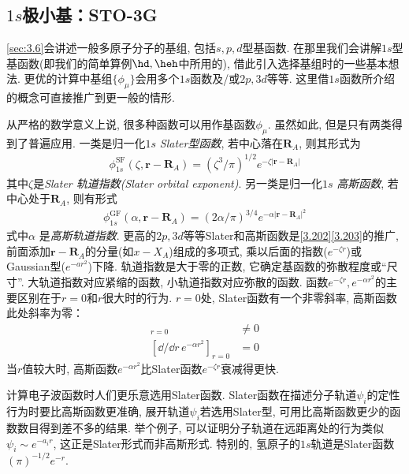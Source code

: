 \subsection{$1s$极小基：STO-3G}
\label{sec3.5.1}
\autoref{sec:3.6}会讲述一般多原子分子的基组, 包括$s,p,d$型基函数. 
在那里我们会讲解$1s$型基函数(即我们的简单算例$\hd,\heh$中所用的), 借此引入选择基组时的一些基本想法. 
更优的计算中基组$\{\phi_\mu\}$会用多个$1s$函数及/或$2p,3d$等等. 
这里借$1s$函数所介绍的概念可直接推广到更一般的情形.

从严格的数学意义上说, 
很多种函数可以用作基函数$\phi_\mu$. 
虽然如此, 
但是只有两类得到了普遍应用. 
一类是归一化$1s$ \emph{Slater型函数}, 
若中心落在$\mathbf{R}_A$, 
则其形式为
\begin{align}
	\label{3.202}
	\phi_{1s}^\mathrm{SF}(\zeta,\mathbf{r-R}_A) = (\zeta^3/\pi)^{1/2}e^{-\zeta|\mathbf{r-R}_A|}
\end{align}
其中$\zeta$是\emph{Slater 轨道指数(Slater orbital exponent)}. 
另一类是归一化$1s$ \emph{高斯函数}, 
若中心处于$\mathbf{R}_A$, 
则有形式
\begin{align}
	\label{3.203}
	\phi_{1s}^\mathrm{GF}(\alpha,\mathbf{r-R}_A) = (2\alpha/\pi)^{3/4}e^{-\alpha|\mathbf{r-R}_A|^2}
\end{align}
式中$\alpha$ 是\emph{高斯轨道指数}. 
更高的$2p,3d$等等Slater和高斯函数是\autoref{3.202}\autoref{3.203}的推广, 
前面添加$\mathbf{r-R}_A$的分量(如$x-X_A$)组成的多项式, 
乘以后面的指数($e^{-\zeta r}$)或Gaussian型($e^{-ar^2}$)下降. 
轨道指数是大于零的正数, 
它确定基函数的弥散程度或``尺寸''. 
大轨道指数对应紧缩的函数, 
小轨道指数对应弥散的函数. 
函数$e^{-\zeta r},e^{-\alpha r^2}$的主要区别在于$r=0$和$r$很大时的行为. 
$r=0$处, 
Slater函数有一个非零斜率, 
高斯函数此处斜率为零：
\begin{align}
	[\dd/\dd r\, e^{-\zeta r}]_{r=0}& \neq 0\\
	[\dd/\dd r\, e^{-\alpha r^2}]_{r=0}&  =   0
\end{align}
当$r$值较大时, 
高斯函数$e^{-\alpha r^2}$比Slater函数$e^{-\zeta r}$衰减得更快.


计算电子波函数时人们更乐意选用Slater函数. 
Slater函数在描述分子轨道$\psi_i$的定性行为时要比高斯函数更准确, 
展开轨道$\psi_i$若选用Slater型, 
可用比高斯函数更少的函数数目得到差不多的结果. 
举个例子, 
可以证明分子轨道在远距离处的行为类似$\psi_i\sim e^{-a_ir}$, 
这正是Slater形式而非高斯形式. 
特别的, 
氢原子的$1s$轨道是Slater函数$(\pi)^{-1/2}e^{-r}$.



